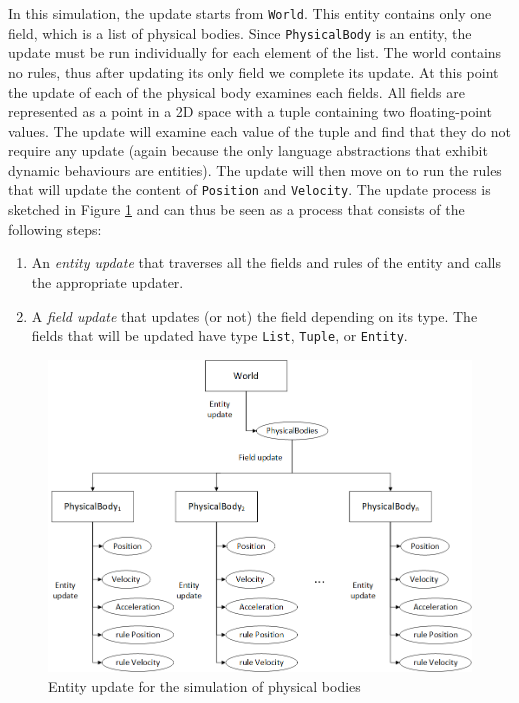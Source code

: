 \noindent
In this simulation, the update starts from \texttt{World}. This entity contains only one field, which is a list of physical bodies. Since \texttt{PhysicalBody} is an entity, the update must be run individually for each element of the list. The world contains no rules, thus after updating its only field we complete its update. At this point the update of each of the physical body examines each fields. All fields are represented as a point in a 2D space with a tuple containing two floating-point values. The update will examine each value of the tuple and find that they do not require any update (again because the only language abstractions that exhibit dynamic behaviours are entities). The update will then move on to run the rules that will update the content of \texttt{Position} and \texttt{Velocity}. The update process is sketched in Figure \ref{fig:ch_networking_simulation_update} and can thus be seen as a process that consists of the following steps:

\begin{enumerate}[noitemsep]
	\item An \textit{entity update} that traverses all the fields and rules of the entity and calls the appropriate updater.
	\item A \textit{field update} that updates (or not) the field depending on its type. The fields that will be updated have type \texttt{List}, \texttt{Tuple}, or \texttt{Entity}.
\end{enumerate}

\begin{figure}
	\centering
	\includegraphics[width=\textwidth]{Figures/chapter_networking/update_traversal}
	\caption{Entity update for the simulation of physical bodies}
	\label{fig:ch_networking_simulation_update}
\end{figure}

